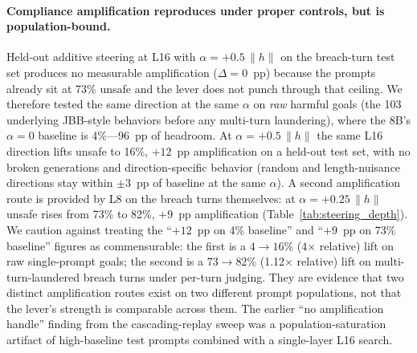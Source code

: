 \documentclass[11pt]{article}
\begin{document}
\paragraph{Compliance amplification reproduces under proper controls, but is population-bound.}
Held-out additive steering at L16 with $\alpha=+0.5\,\|h\|$ on the breach-turn test set produces no measurable amplification ($\Delta = 0$~pp) because the prompts already sit at 73\% unsafe and the lever does not punch through that ceiling.
We therefore tested the same direction at the same $\alpha$ on \emph{raw} harmful goals (the 103 underlying JBB-style behaviors before any multi-turn laundering), where the 8B's $\alpha=0$ baseline is 4\%---96~pp of headroom.
At $\alpha=+0.5\,\|h\|$ the same L16 direction lifts unsafe to 16\%, $+12$~pp amplification on a held-out test set, with no broken generations and direction-specific behavior (random and length-nuisance directions stay within $\pm 3$~pp of baseline at the same $\alpha$).
A second amplification route is provided by L8 on the breach turns themselves: at $\alpha = +0.25\,\|h\|$ unsafe rises from 73\% to 82\%, $+9$~pp amplification (Table~\ref{tab:steering_depth}).
We caution against treating the ``$+12$~pp on 4\% baseline'' and ``$+9$~pp on 73\% baseline'' figures as commensurable: the first is a $4\to 16$\% (4$\times$ relative) lift on raw single-prompt goals; the second is a $73\to 82$\% (1.12$\times$ relative) lift on multi-turn-laundered breach turns under per-turn judging. They are evidence that two distinct amplification routes exist on two different prompt populations, not that the lever's strength is comparable across them.
The earlier ``no amplification handle'' finding from the cascading-replay sweep was a population-saturation artifact of high-baseline test prompts combined with a single-layer L16 search.
\end{document}
